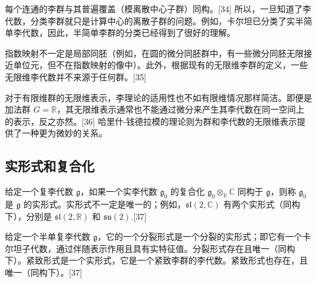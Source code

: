每个连通的李群与其普遍覆盖（模离散中心子群）同构。[34] 所以，一旦知道了李代数，分类李群就只是计算中心的离散子群的问题。例如，卡尔坦已分类了实半简单李代数，因此，半简单李群的分类已经得到了很好的理解。

指数映射不一定是局部同胚（例如，在圆的微分同胚群中，有一些微分同胚无限接近单位元，但不在指数映射的像中）。此外，根据现有的无限维李群的定义，一些无限维李代数并不来源于任何群。[35]

对于有限维群的无限维表示，李理论的适用性也不如有限维情况那样简洁。即便是加法群 \(G = \mathbb{R}\)，其无限维表示通常也不能通过微分来产生其李代数在同一空间上的表示，反之亦然。[36] 哈里什-钱德拉模的理论则为群和李代数的无限维表示提供了一种更为微妙的关系。
\subsection{实形式和复合化}
给定一个复李代数 \({\mathfrak {g}}\)，如果一个实李代数 \({\mathfrak {g}}_0\) 的复合化 \({\mathfrak {g}}_0 \otimes_{\mathbb{R}} \mathbb{C}\) 同构于 \({\mathfrak {g}}\)，则称 \({\mathfrak {g}}_0\) 是 \({\mathfrak {g}}\) 的实形式。实形式不一定是唯一的；例如，\({\mathfrak {sl}}(2, \mathbb{C})\) 有两个实形式（同构下），分别是 \({\mathfrak {sl}}(2, \mathbb{R})\) 和 \({\mathfrak {su}}(2)\).[37]

给定一个半单复李代数 \({\mathfrak {g}}\)，它的一个分裂形式是一个分裂的实形式；即它有一个卡尔坦子代数，通过伴随表示作用且具有实特征值。分裂形式存在且唯一（同构下）。紧致形式是一个实形式，它是一个紧致李群的李代数。紧致形式也存在，且唯一（同构下）。[37]